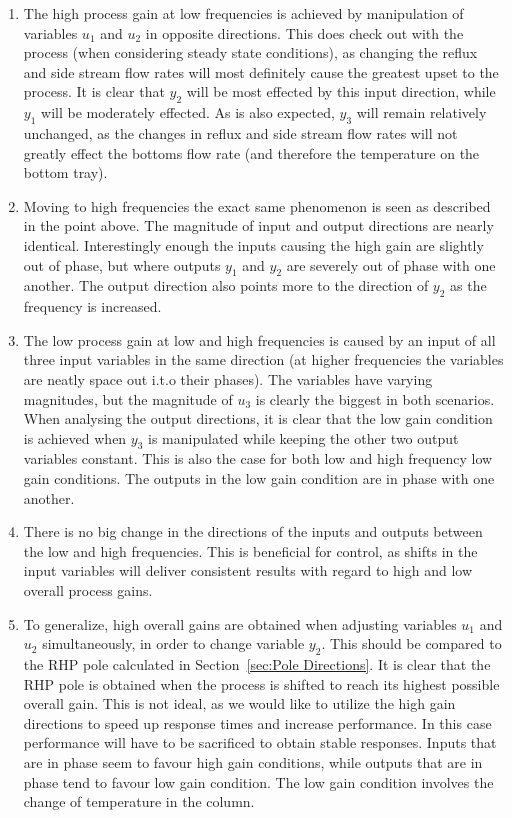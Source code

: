\begin{enumerate}
	\item The high process gain at low frequencies is achieved by manipulation of variables $u_1$ and $u_2$ in opposite directions. This does check out with the process (when considering steady state conditions), as changing the reflux and side stream flow rates will most definitely cause the greatest upset to the process. It is clear that $y_2$ will be most effected by this input direction, while $y_1$ will be moderately effected. As is also expected, $y_3$ will remain relatively unchanged, as the changes in reflux and side stream flow rates will not greatly effect the bottoms flow rate (and therefore the temperature on the bottom tray).
	\item  Moving to high frequencies the exact same phenomenon is seen as described in the point above. The magnitude of input and output directions are nearly identical. Interestingly enough the inputs causing the high gain are slightly out of phase, but where outputs $y_1$ and $y_2$ are severely out of phase with one another. The output direction also points more to the direction of $y_2$ as the frequency is increased.
	\item The low process gain at low and high frequencies is caused by an input of all three input variables in the same direction (at higher frequencies the variables are neatly space out i.t.o their phases). The variables have varying magnitudes, but the magnitude of $u_3$ is clearly the biggest in both scenarios. When analysing the output directions, it is clear that the low gain condition is achieved when $y_3$ is manipulated while keeping the other two output variables constant. This is also the case for both low and high frequency low gain conditions. The outputs in the low gain condition are in phase with one another.
	\item There is no big change in the directions of the inputs and outputs between the low and high frequencies. This is beneficial for control, as shifts in the input variables will deliver consistent results with regard to high and low overall process gains.
	\item To generalize, high overall gains are obtained when adjusting variables $u_1$ and $u_2$ simultaneously, in order to change variable $y_2$. This should be compared to the RHP pole calculated in Section~\ref{sec:Pole Directions}. It is clear that the RHP pole is obtained when the process is shifted to reach its highest possible overall gain. This is not ideal, as we would like to utilize the high gain directions to speed up response times and increase performance. In this case performance will have to be sacrificed to obtain stable responses. Inputs that are in phase seem to favour high gain conditions, while outputs that are in phase tend to favour low gain condition. The low gain condition involves the change of temperature in the column. 
	
\end{enumerate}

